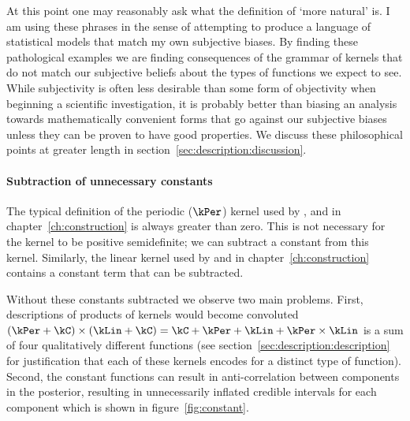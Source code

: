 At this point one may reasonably ask what the definition of `more natural' is.
I am using these phrases in the sense of attempting to produce a language of statistical models that match my own subjective biases.
By finding these pathological examples we are finding consequences of the grammar of kernels that do not match our subjective beliefs about the types of functions we expect to see.
While subjectivity is often less desirable than some form of objectivity when beginning a scientific investigation, it is probably better than biasing an analysis towards mathematically convenient forms that go against our subjective biases unless they can be proven to have good properties.
We discuss these philosophical points at greater length in section~\ref{sec:description:discussion}.

\paragraph{Subtraction of unnecessary constants}

The typical definition of the periodic ($\kPer$) kernel \citep[e.g.][]{Rasmussen2006-ml} used by \citet{Duvenaud2013-dn}, \citet{Kronberger_undated-vf} and in chapter~\ref{ch:construction} is always greater than zero.
This is not necessary for the kernel to be positive semidefinite; we can subtract a constant from this kernel.
Similarly, the linear kernel used by \citet{Duvenaud2013-dn} and in chapter~\ref{ch:construction} contains a constant term that can be subtracted.

Without these constants subtracted we observe two main problems.
First, descriptions of products of kernels would become convoluted \eg $(\kPer + \kC) \times (\kLin + \kC) = \kC + \kPer + \kLin + \kPer \times \kLin$ is a sum of four qualitatively different functions (see section~\ref{sec:description:description} for justification that each of these kernels encodes for a distinct type of function).
Second, the constant functions can result in anti-correlation between components in the posterior, resulting in unnecessarily inflated credible intervals for each component which is shown in figure~\ref{fig:constant}.

